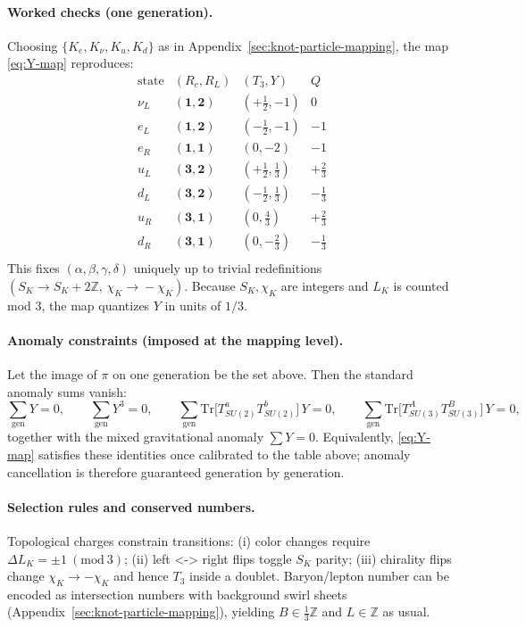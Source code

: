 \documentclass[11pt, preprint,titlepage]{revtex4-2}
\begin{document}
	\paragraph{Worked checks (one generation).}
	Choosing \(\{K_e,K_\nu,K_u,K_d\}\) as in Appendix~\ref{sec:knot-particle-mapping}, the map \eqref{eq:Y-map} reproduces:
	\[
		\begin{array}{c|c|c|c}
			\text{state} & (R_c,R_L) & (T_3,Y) & Q \\
			\hline
			\nu_L & (\mathbf{1},\mathbf{2}) & (+\tfrac{1}{2},-1) & 0 \\
			e_L  & (\mathbf{1},\mathbf{2}) & (-\tfrac{1}{2},-1) & -1 \\
			e_R  & (\mathbf{1},\mathbf{1}) & (0,-2) & -1 \\
			u_L  & (\mathbf{3},\mathbf{2}) & (+\tfrac{1}{2},\tfrac{1}{3}) & +\tfrac{2}{3} \\
			d_L  & (\mathbf{3},\mathbf{2}) & (-\tfrac{1}{2},\tfrac{1}{3}) & -\tfrac{1}{3} \\
			u_R  & (\mathbf{3},\mathbf{1}) & (0,\tfrac{4}{3}) & +\tfrac{2}{3} \\
			d_R  & (\mathbf{3},\mathbf{1}) & (0,-\tfrac{2}{3}) & -\tfrac{1}{3} \\
		\end{array}
	\]
	This fixes \((\alpha,\beta,\gamma,\delta)\) uniquely up to trivial redefinitions \((S_K\!\to\!S_K+2\mathbb{Z},\,\chi_K\!\to\!-\chi_K)\).
	Because \(S_K,\chi_K\) are integers and \(L_K\) is counted mod \(3\), the map quantizes \(Y\) in units of \(1/3\).

	\paragraph{Anomaly constraints (imposed at the mapping level).}
	Let the image of \(\pi\) on one generation be the set above.
	Then the standard anomaly sums vanish:
	\[
		\sum_{\text{gen}} Y = 0,\qquad
		\sum_{\text{gen}} Y^3 = 0,\qquad
		\sum_{\text{gen}} \mathrm{Tr}\big[T^a_{SU(2)}T^b_{SU(2)}\big]\,Y=0,\qquad
		\sum_{\text{gen}} \mathrm{Tr}\big[T^A_{SU(3)}T^B_{SU(3)}\big]\,Y=0,
	\]
	together with the mixed gravitational anomaly \(\sum Y=0\).
	Equivalently, \eqref{eq:Y-map} satisfies these identities once calibrated to the table above; anomaly cancellation is therefore guaranteed generation by generation.

	\paragraph{Selection rules and conserved numbers.}
	Topological charges constrain transitions:
	(i) color changes require \(\Delta L_K=\pm1\ (\mathrm{mod}\ 3)\);
	(ii) left <-> right flips toggle \(S_K\) parity;
	(iii) chirality flips change \(\chi_K\to-\chi_K\) and hence \(T_3\) inside a doublet.
	Baryon/lepton number can be encoded as intersection numbers with background swirl sheets (Appendix~\ref{sec:knot-particle-mapping}), yielding \(B\in\tfrac{1}{3}\mathbb{Z}\) and \(L\in\mathbb{Z}\) as usual.
\end{document}

